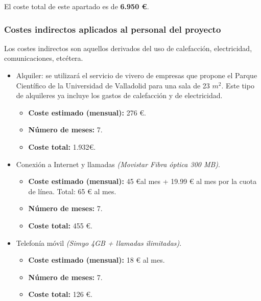 \documentclass[twoside]{report}
\begin{document}
El coste total de este apartado es de \textbf{6.950 \euro}.

\subsubsection{Costes indirectos aplicados al personal del proyecto}

Los costes indirectos son aquellos derivados del uso de calefacción, electricidad, comunicaciones, etcétera.

\begin{itemize}

\item Alquiler: se utilizará el servicio de vivero de empresas que propone el Parque Científico de la Universidad de Valladolid \cite{pcuva} para una sala de 23 ${m}^{2}$. Este tipo de alquileres ya incluye los gastos de calefacción y de electricidad.
	\begin{itemize}
		\item \textbf{Coste estimado (mensual): } 276 \euro.
		\item \textbf{Número de meses:} 7.
		\item \textbf{Coste total:} 1.932\euro.
	\end{itemize}
	
\item Conexión a Internet y llamadas \textit{(Movistar Fibra óptica 300 MB)}.
	\begin{itemize}
		\item \textbf{Coste estimado (mensual):} 45 \euro \hspace{0.1cm}al mes + 19.99 \euro \hspace{0.1cm} al mes por la cuota de línea. Total: 65 \euro \hspace{0.1cm} al mes.
		\item \textbf{Número de meses:} 7.
		\item \textbf{Coste total:} 455 \euro.
	\end{itemize}
		
\item Telefonía móvil \textit{(Simyo 4GB + llamadas ilimitadas)}.
	\begin{itemize}
		\item \textbf{Coste estimado (mensual):} 18 \euro \hspace{0.1cm} al mes.
		\item \textbf{Número de meses:} 7.
		\item \textbf{Coste total:} 126 \euro.
	\end{itemize}

\end{itemize}
\end{document}
